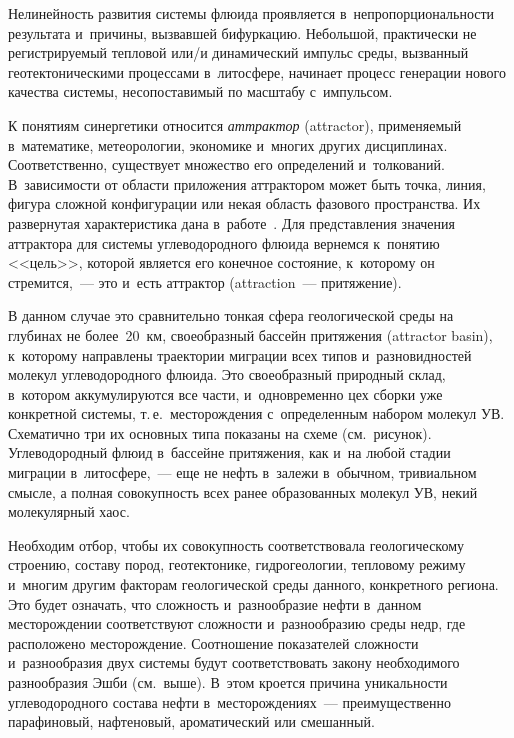 \begin{multicols}{2}
    Нелинейность развития системы флюида проявляется 
в~непропорциональности результата и~причины, вызвавшей бифуркацию. 
Небольшой, практически не регистрируемый тепловой или/и динамический 
импульс среды, вызванный геотектоническими процессами в~литосфере, начинает 
процесс генерации нового качества системы, несопоставимый по масштабу 
с~импульсом.
    
    К понятиям синергетики относится \textit{аттрактор} (attractor), 
применяемый в~математике, метеорологии, экономике и~многих других 
дисциплинах. Соответственно, существует множество его определений 
и~толкований. В~зависимости от области приложения аттрактором может быть 
точка, линия, фигура сложной конфигурации или некая область фазового 
пространства. Их развернутая характеристика дана в~работе~\cite{13-s}. Для 
представления значения аттрактора для сис\-те\-мы углеводородного
флю\-ида вернемся 
к~понятию <<цель>>, которой является его конечное состояние, к~которому он 
стремится,~--- это и~есть аттрактор (attraction~--- притяжение). 
    
    В данном случае это сравнительно тонкая сфера геологической среды на 
глубинах не более~20~км, своеобразный бассейн притяжения (attractor basin), 
к~которому направлены траектории миграции всех типов и~разновидностей 
молекул углеводородного флю\-ида. Это своеобразный природный склад, в~котором 
аккумулируются все час\-ти, и~одновременно цех сборки уже конкретной сис\-те\-мы, 
т.\,е.\ месторождения с~определенным набором молекул УВ. Схематично три их 
основных типа показаны на схеме (см.\ рисунок). Углеводородный
флю\-ид в~бассейне 
притяжения, как и~на любой стадии миграции в~литосфере,~--- еще не нефть 
в~залежи в~обычном, тривиальном смысле, а полная совокупность всех ранее 
образованных мо\-ле\-кул УВ, некий молекулярный хаос. 
    
    Необходим отбор, чтобы их совокупность соответствовала геологическому 
строению, составу пород, геотектонике, гидрогеологии, тепловому режиму 
и~многим другим факторам геологической среды данного, конкретного региона. 
Это будет означать, что сложность и~разнообразие нефти в~данном 
месторождении соответствуют слож\-ности и~разнообразию среды недр, где 
расположено месторождение. Соотношение показателей слож\-ности 
и~разнообразия двух сис\-те\-мы будут соответствовать закону необходимого 
разнообразия Эшби (см.\ выше). В~этом кроется причина уни\-каль\-ности  
углеводородного со\-ста\-ва нефти в~месторождениях~--- преимущественно парафиновый, 
нафтеновый, ароматический или смешанный.


\end{multicols}
